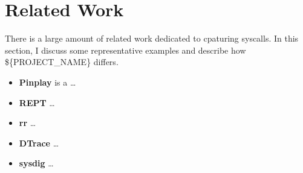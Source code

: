 \section{Related Work}
There is a large amount of related work dedicated to cpaturing syscalls. In this section, I discuss some representative examples and describe
how \$\{PROJECT\_NAME\} differs.

\begin{itemize}
    \item \textbf{Pinplay} is a \dots
    \item \textbf{REPT} \dots
    \item \textbf{rr} \dots
    \item \textbf{DTrace} \dots
    \item \textbf{sysdig} \dots
\end{itemize}



